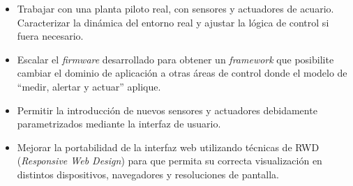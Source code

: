 \begin{itemize}
	\item Trabajar con una planta piloto real, con sensores y actuadores de acuario.  Caracterizar la dinámica del entorno real y ajustar la lógica de control si fuera necesario.
	\vspace{5px}
	\item Escalar el \textit{firmware} desarrollado para obtener un \textit{framework} que posibilite cambiar el dominio de aplicación a otras áreas de control donde el modelo de ``medir, alertar y actuar'' aplique.
	\vspace{5px}
	\item Permitir la introducción de nuevos sensores y actuadores debidamente parametrizados mediante la interfaz de usuario.
	\vspace{5px}
	\item Mejorar la portabilidad de la interfaz web utilizando técnicas de RWD (\textit{Responsive Web Design}) para que permita su correcta visualización en distintos dispositivos, navegadores y resoluciones de pantalla.
\end{itemize}






